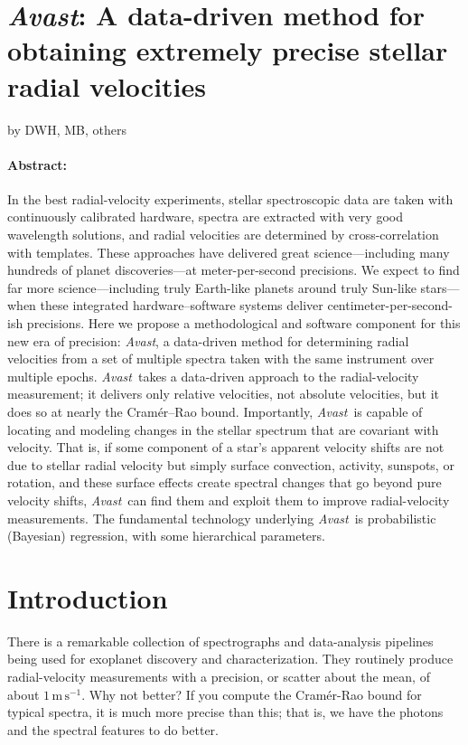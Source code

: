 \documentclass[12pt, letterpaper]{article}
\newcommand{\project}[1]{\textsl{#1}}
\newcommand{\Avast}{\project{Avast}}
\newcommand{\unit}[1]{\mathrm{#1}}
\newcommand{\m}{\unit{m}}
\newcommand{\s}{\unit{s}}
\newcommand{\mps}{\m\,\s^{-1}}
\begin{document}
\section*{\Avast: A data-driven method for obtaining extremely precise stellar radial velocities}

\noindent
by DWH, MB, others

\paragraph{Abstract:}
In the best radial-velocity experiments, stellar
spectroscopic data are taken with continuously calibrated hardware,
spectra are extracted with very good wavelength solutions, and radial
velocities are determined by cross-correlation with templates.
These approaches have delivered great science---including many
hundreds of planet discoveries---at meter-per-second precisions.
We expect to find far more science---including truly Earth-like
planets around truly Sun-like stars---when these integrated
hardware--software systems deliver centimeter-per-second-ish
precisions.
Here we propose a methodological and software component for this new
era of precision: \Avast, a data-driven method for determining
radial velocities from a set of multiple spectra taken with the same
instrument over multiple epochs.
\Avast\ takes a data-driven approach to the radial-velocity
measurement; it delivers only relative velocities, not absolute
velocities, but it does so at nearly the Cram\'er--Rao bound.
Importantly, \Avast\ is capable of locating and modeling changes in
the stellar spectrum that are covariant with velocity.
That is, if some component of a star's apparent velocity shifts are
not due to stellar radial velocity but simply surface convection,
activity, sunspots, or rotation, and these surface effects create
spectral changes that go beyond pure velocity shifts, \Avast\ can find
them and exploit them to improve radial-velocity measurements.
The fundamental technology underlying \Avast\ is probabilistic
(Bayesian) regression, with some hierarchical parameters.

\section{Introduction}

There is a remarkable collection of spectrographs and data-analysis
pipelines being used for exoplanet discovery and characterization.
They routinely produce radial-velocity measurements with a precision,
or scatter about the mean, of about $1\,\mps$.
Why not better?
If you compute the Cram\'er-Rao bound for typical spectra, it is much
more precise than this; that is, we have the photons and the spectral
features to do better.
\end{document}
